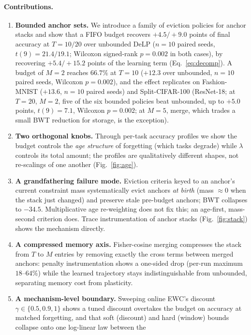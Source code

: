 \documentclass[review,12pt,number]{elsarticle}
\newcommand{\delp}{DeLP}
\begin{document}
\paragraph{Contributions.}
\begin{enumerate}
\item \textbf{Bounded anchor sets.} We introduce a family of eviction
policies for anchor stacks and show that a FIFO budget recovers
$+4.5/+9.0$ points of final accuracy at $T{=}10/20$ over unbounded
\delp{} ($n{=}10$ paired seeds, $t(9){=}21.4/19.1$; Wilcoxon signed-rank
$p{=}0.002$ in both cases), by recovering
$+5.4/+15.2$ points of the learning term (Eq.~\ref{eq:decomp}).
A budget of $M{=}2$ reaches $66.7\%$ at $T{=}10$ ($+12.3$ over
unbounded, $n{=}10$ paired seeds, Wilcoxon $p{=}0.002$), and the effect
replicates on Fashion-MNIST ($+13.6$,
$n{=}10$ paired seeds) and
Split-CIFAR-100 (ResNet-18; at $T{=}20$, $M{=}2$, five of the six bounded
policies beat unbounded, up to $+5.0$ points, $t(9){=}7.1$, Wilcoxon
$p{=}0.002$; at $M{=}5$, merge, which trades a small BWT
reduction for storage, is the exception).
\item \textbf{Two orthogonal knobs.} Through per-task accuracy
profiles we show the budget controls the \emph{age structure} of
forgetting (which tasks degrade) while $\lambda$ controls its total
amount; the profiles are qualitatively different shapes, not
re-scalings of one another (Fig.~\ref{fig:age}).
\item \textbf{A grandfathering failure mode.} Eviction criteria keyed
to an anchor's current constraint mass systematically evict anchors
\emph{at birth} (mass $\approx 0$ when the stack just changed) and
preserve stale pre-budget anchors; BWT collapses to $-34.5$.
Multiplicative age re-weighting does not fix this; an age-first,
mass-second criterion does. Trace instrumentation of anchor stacks
(Fig.~\ref{fig:stack}) shows the mechanism directly.
\item \textbf{A compressed memory axis.} Fisher-cosine merging
compresses the stack from $T$ to $M$ entries by removing exactly the
cross terms between merged anchors: penalty instrumentation shows a
one-sided drop (per-run maximum $18$--$64\%$) while the learned
trajectory stays indistinguishable from unbounded, separating memory
cost from plasticity.
\item \textbf{A mechanism-level boundary.} Sweeping online EWC's
discount $\gamma \in \{0.5, 0.9, 1\}$ shows a tuned discount overtakes
the budget on accuracy at matched forgetting, and that soft (discount)
and hard (window) bounds collapse onto one log-linear law between the

\end{enumerate}
\end{document}
